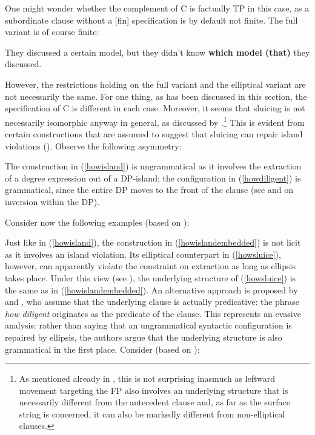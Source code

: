 One might wonder whether the complement of C is factually TP in this case, as a subordinate clause without a [fin] specification is by default not finite. The full variant is of course finite:

\ea They discussed a certain model, but they didn't know \textbf{which model (that)} they discussed.
\z

However, the restrictions holding on the full variant and the elliptical variant are not necessarily the same. For one thing, as has been discussed in this section, the specification of C is different in each case. Moreover, it seems that sluicing is not necessarily isomorphic anyway in general, as discussed by \citet[484--486]{vicente2018}.\footnote{As mentioned already in , this is not surprising inasmuch as leftward movement targeting the FP also involves an underlying structure that is necessarily different from the antecedent clause and, as far as the surface string is concerned, it can also be markedly different from non-elliptical clauses.} This is evident from certain constructions that are assumed to suggest that sluicing can repair island violations (\citealt{merchant2001}). Observe the following asymmetry:

\ea
{}
\z
\z

The construction in (\ref{howisland}) is ungrammatical as it involves the extraction of a degree expression out of a DP-island; the configuration in (\ref{howdiligent}) is grammatical, since the entire DP moves to the front of the clause (see \citealt{kennedymerchant2000} and \citealt[132--139]{bacskaiatkari2018langsci} on inversion within the DP).

Consider now the following examples (based on \citealt[484, ex. 11]{vicente2018}):

\ea
{}
\z
\z

Just like in (\ref{howisland}), the construction in (\ref{howislandembedded}) is not licit as it involves an island violation. Its elliptical counterpart in (\ref{howsluice}), however, can apparently violate the constraint on extraction as long as ellipsis takes place. Under this view (see \citealt{merchant2001}), the underlying structure of (\ref{howsluice}) is the same as in (\ref{howislandembedded}). An alternative approach is proposed by \citet{barroselliottthoms2014} and \citet{vicente2018}, who assume that the underlying clause is actually predicative: the phrase \textit{how diligent} originates as the predicate of the clause. This represents an evasive analysis: rather than saying that an ungrammatical syntactic configuration is repaired by ellipsis, the authors argue that the underlying structure is also grammatical in the first place. Consider (based on \citealt[485, ex. 14]{vicente2018}):

